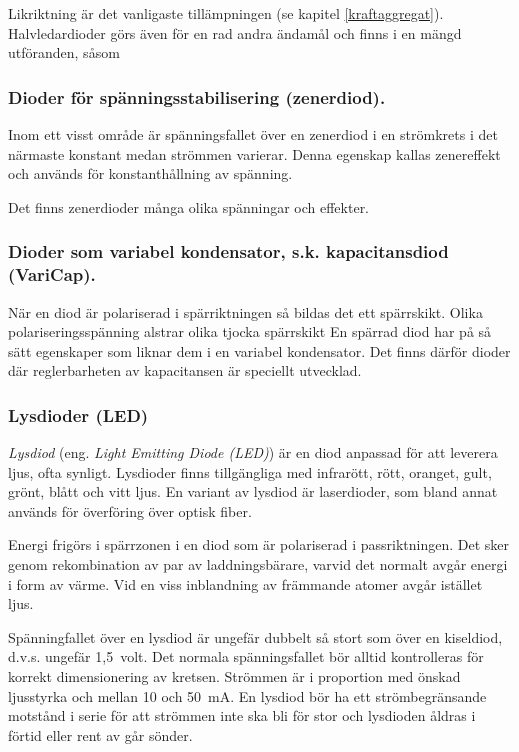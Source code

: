 Likriktning är det vanligaste tillämpningen (se kapitel \ref{kraftaggregat}).
Halvledardioder görs även för en rad andra ändamål och finns i en mängd
utföranden, såsom

\subsubsection{Dioder för spänningsstabilisering (zenerdiod).}

  Inom ett visst område är spänningsfallet över en zenerdiod i en strömkrets
  i det närmaste konstant medan strömmen varierar. Denna egenskap kallas
  zenereffekt och används för konstanthållning av spänning.

  Det finns zenerdioder många olika spänningar och effekter.

\subsubsection{Dioder som variabel kondensator, s.k. kapacitansdiod (VariCap).}
\label{varicap}

  När en diod är polariserad i spärriktningen så bildas det ett spärrskikt.
  Olika polariseringsspänning alstrar olika tjocka spärrskikt En spärrad diod
  har på så sätt egenskaper som liknar dem i en variabel kondensator. Det finns
  därför dioder där reglerbarheten av kapacitansen är speciellt utvecklad.

\subsubsection{Lysdioder (LED)}

\emph{Lysdiod} (eng. \emph{Light Emitting Diode (LED)}) är en diod anpassad för
att leverera ljus, ofta synligt.
Lysdioder finns tillgängliga med infrarött, rött, oranget, gult, grönt,
blått och vitt ljus.
En variant av lysdiod är laserdioder, som bland annat används för överföring
över optisk fiber.

Energi frigörs i spärrzonen i en diod som är polariserad i passriktningen.
Det sker genom rekombination av par av laddningsbärare, varvid det normalt avgår
energi i form av värme.
Vid en viss inblandning av främmande atomer avgår istället ljus.

Spänningfallet över en lysdiod är ungefär dubbelt så stort som över en
kiseldiod, d.v.s. ungefär 1,5~volt.
Det normala spänningsfallet bör alltid kontrolleras för korrekt dimensionering
av kretsen.
Strömmen är i proportion med önskad ljusstyrka och mellan 10 och 50~mA.
En lysdiod bör ha ett strömbegränsande motstånd i serie för att strömmen
inte ska bli för stor och lysdioden åldras i förtid eller rent av går
sönder.

